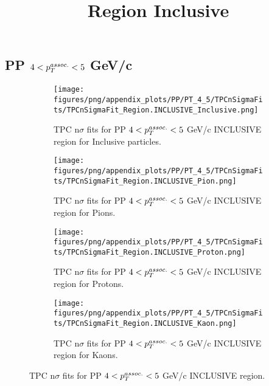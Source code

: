     
            \subsection{PP $4 < \pTassoc < 5$ GeV/c}
            \begin{figure}[H]
                \title{Region Inclusive}
                \begin{subfigure}[b]{0.5\textwidth}
                    \centering
                    \texttt{[image: figures/png/appendix\_plots/PP/PT\_4\_5/TPCnSigmaFits/TPCnSigmaFit\_Region.INCLUSIVE\_Inclusive.png]}
                    \caption{TPC n$\sigma$ fits for PP $4 < \pTassoc < 5$ GeV/c INCLUSIVE region for Inclusive particles.}
                    \label{fig:appendix_PP_$4 < \pTassoc < 5$ GeV/c_INCLUSIVE_Inclusive}
                \end{subfigure}
                \begin{subfigure}[b]{0.5\textwidth}
                    \centering
                    \texttt{[image: figures/png/appendix\_plots/PP/PT\_4\_5/TPCnSigmaFits/TPCnSigmaFit\_Region.INCLUSIVE\_Pion.png]}
                    \caption{TPC n$\sigma$ fits for PP $4 < \pTassoc < 5$ GeV/c INCLUSIVE region for Pions.}
                    \label{fig:appendix_PP_$4 < \pTassoc < 5$ GeV/c_INCLUSIVE_Pion}
                \end{subfigure}
                \begin{subfigure}[b]{0.5\textwidth}
                    \centering
                    \texttt{[image: figures/png/appendix\_plots/PP/PT\_4\_5/TPCnSigmaFits/TPCnSigmaFit\_Region.INCLUSIVE\_Proton.png]}
                    \caption{TPC n$\sigma$ fits for PP $4 < \pTassoc < 5$ GeV/c INCLUSIVE region for Protons.}
                    \label{fig:appendix_PP_$4 < \pTassoc < 5$ GeV/c_INCLUSIVE_Proton}
                \end{subfigure}
                \begin{subfigure}[b]{0.5\textwidth}
                    \centering
                    \texttt{[image: figures/png/appendix\_plots/PP/PT\_4\_5/TPCnSigmaFits/TPCnSigmaFit\_Region.INCLUSIVE\_Kaon.png]}
                    \caption{TPC n$\sigma$ fits for PP $4 < \pTassoc < 5$ GeV/c INCLUSIVE region for Kaons.}
                    \label{fig:appendix_PP_$4 < \pTassoc < 5$ GeV/c_INCLUSIVE_Kaon}
                \end{subfigure}
                \caption{TPC n$\sigma$ fits for PP $4 < \pTassoc < 5$ GeV/c INCLUSIVE region.}
                \label{fig:appendix_PP_$4 < \pTassoc < 5$ GeV/c_INCLUSIVE}
            \end{figure}
